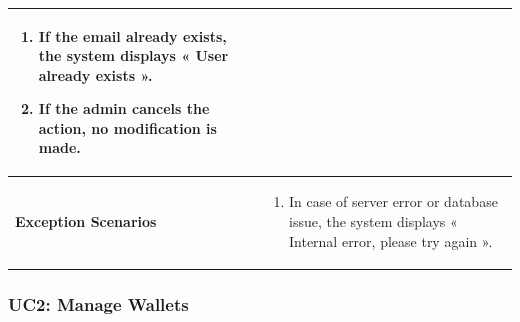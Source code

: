 \begin{longtable}{|p{4cm}|p{10cm}|}
\begin{enumerate}[nosep,leftmargin=*]
        \item If the email already exists, the system displays « User already exists ».
        \item If the admin cancels the action, no modification is made.
      \end{enumerate} \\ \hline
    \textbf{Exception Scenarios} &
      \begin{enumerate}[nosep,leftmargin=*]
        \item In case of server error or database issue, the system displays « Internal error, please try again ».
      \end{enumerate} \\ \hline
\end{longtable}

\subsubsection{UC2: Manage Wallets}

